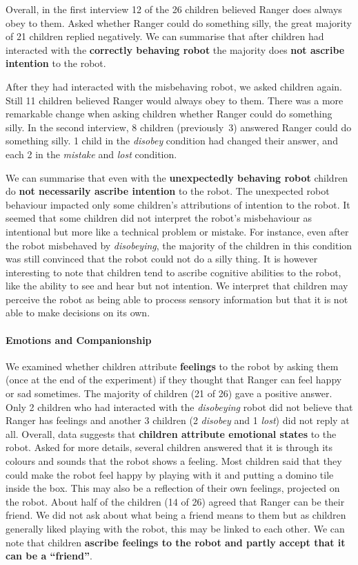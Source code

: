 \documentclass{sig-alternate}
\begin{document}
Overall, in the first interview 12 of the 26 children believed Ranger does
always obey to them. Asked whether Ranger could do something silly, the great
majority of 21 children replied negatively. We can summarise that after children
had interacted with the \textbf{correctly behaving robot} the majority does
\textbf{not ascribe intention} to the robot.

After they had interacted with the misbehaving robot, we asked children again.
Still 11 children believed Ranger would always obey to them. There was a
more remarkable change when asking children whether Ranger could do something
silly. In the second interview, 8 children (previously~3) answered Ranger could
do something silly. 1 child in the \textit{disobey} condition had changed their
answer, and each 2 in the \textit{mistake} and \textit{lost} condition. 

We can summarise that even with the \textbf{unexpectedly behaving robot}
children do \textbf{not necessarily ascribe intention} to the robot. The
unexpected robot behaviour impacted only some children's attributions of
intention to the robot.  It seemed that some children did not interpret the
robot's misbehaviour as intentional but more like a technical problem or
mistake. For instance, even after the robot misbehaved by \textit{disobeying},
the majority of the children in this condition was still convinced that the
robot could not do a silly thing.  It is however interesting to note that children tend
to ascribe cognitive abilities to the robot, like the ability to see and hear
but not intention. We interpret that children may perceive the robot as being
able to process sensory information but that it is not able to make decisions on
its own. 

\paragraph{Emotions and Companionship}

We examined whether children attribute \textbf{feelings} to the robot by asking
them (once at the end of the experiment) if they thought that Ranger can feel
happy or sad sometimes. The majority of
children (21 of 26) gave a positive answer. Only 2 children who had interacted
with the \textit{disobeying} robot did not believe that Ranger has feelings and
another 3 children (2 \textit{disobey} and 1 \textit{lost}) did not reply at
all. Overall, data suggests that \textbf{children attribute emotional states}
to the robot. Asked for more details, several children answered that it is
through its colours and sounds that the robot shows a feeling. Most children said
that they could make the robot feel happy by playing with it and putting a
domino tile inside the box. This may also be a reflection of their own feelings,
projected on the robot. About half of the children (14 of 26) agreed that Ranger
can be their friend. We did not ask about what being a friend means to them but
as children generally liked playing with the robot, this may be linked to each
other. We can note that children \textbf{ascribe feelings to the robot and
partly accept that it can be a ``friend''}.
\end{document}
